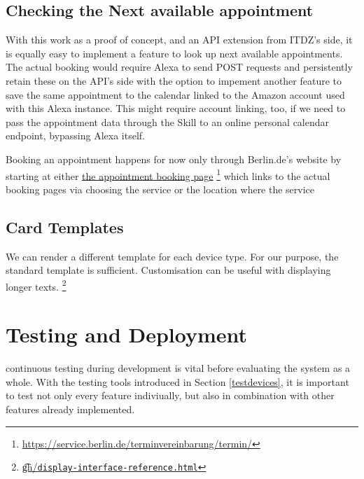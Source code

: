 \subsection*{Checking the Next available appointment}

With this work as a proof of concept, and an API extension from ITDZ's side, it is equally easy to implement a feature to look up next available appointments.
The actual booking would require Alexa to send POST requests and persistently retain these on the API's side with the option to impement another feature to save the same appointment to the calendar linked to the Amazon account used with this Alexa instance. This might require account linking, too, if we need to pass the appointment data through the Skill to an online personal calendar endpoint, bypassing Alexa itself.

Booking an appointment happens for now only through Berlin.de's website by starting at either \href{https://service.berlin.de/terminvereinbarung/termin/}{the appointment booking page} \footnote{\url{https://service.berlin.de/terminvereinbarung/termin/}} which links to the actual booking pages via choosing the service or the location where the service 



\subsection*{Card Templates}

We can render a different template for each device type. For our purpose, the standard template is sufficient. Customisation can be useful with displaying longer texts. \footnote{\href{https://developer.amazon.com/docs/custom-skills/display-interface-reference.html}{\t{gh}/\texttt{display-interface-reference.html}}}

%


\section{Testing and Deployment}

continuous testing during development is vital before evaluating the system as a whole. %
With the testing tools introduced in Section \ref{testdevices}, it is important to test not only every feature indiviually, but also in combination with other features already implemented.



